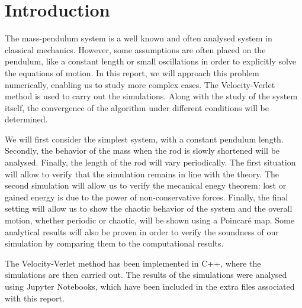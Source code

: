 \section{Introduction}

The mass-pendulum system is a well known and often analysed system in classical mechanics. However, some assumptions are often placed on the pendulum, like a constant length or small oscillations in order to explicitly solve the equations of motion. In this report, we will approach this problem numerically, enabling us to study more complex cases. The Velocity-Verlet method is used to carry out the simulations. Along with the study of the system itself, the convergence of the algorithm under different conditions will be determined.

We will first consider the simplest system, with a constant pendulum length. Secondly, the behavior of the mass when the rod is slowly shortened will be analysed. Finally, the length of the rod will vary periodically. The first situation will allow to verify that the simulation remains in line with the theory. The second simulation will allow us to verify the mecanical enegy theorem: lost or gained energy is due to the power of non-conservative forces. Finally, the final setting will allow us to show the chaotic behavior of the system and the overall motion, whether periodic or chaotic, will be shown using a Poincaré map. Some analytical results will also be proven in order to verify the soundness of our simulation by comparing them to the computational results.

The Velocity-Verlet method has been implemented in C++, where the simulations are then carried out. The results of the simulations were analysed using Jupyter Notebooks, which have been included in the extra files associated with this report.